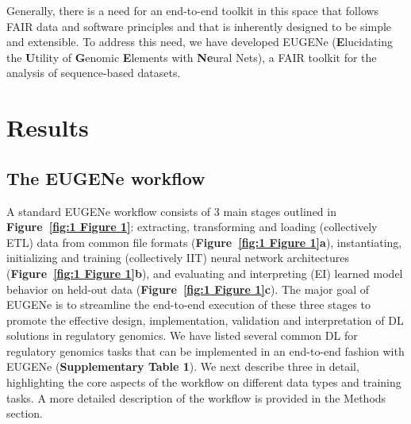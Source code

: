 Generally, there is a need for an end-to-end toolkit in this space that follows FAIR data and software principles\cite{Barker2022-on} and that is inherently designed to be simple and extensible. To address this need, we have developed EUGENe (\textbf{E}lucidating the \textbf{U}tility of \textbf{G}enomic \textbf{E}lements with \textbf{Ne}ural Nets), a FAIR toolkit for the analysis of sequence-based datasets.

\section{Results}

\subsection{The EUGENe workflow}

A standard EUGENe workflow consists of 3 main stages outlined in \textbf{Figure~\ref{fig:1 Figure 1}}: extracting, transforming and loading (collectively ETL) data from common file formats (\textbf{Figure~\ref{fig:1 Figure 1}a}), instantiating, initializing and training (collectively IIT) neural network architectures (\textbf{Figure~\ref{fig:1 Figure 1}b}), and evaluating and interpreting (EI) learned model behavior on held-out data (\textbf{Figure~\ref{fig:1 Figure 1}c}). The major goal of EUGENe is to streamline the end-to-end execution of these three stages to promote the effective design, implementation, validation and interpretation of DL solutions in regulatory genomics. We have listed several common DL for regulatory genomics tasks that can be implemented in an end-to-end fashion with EUGENe (\textbf{Supplementary Table 1}). We next describe three in detail, highlighting the core aspects of the workflow on different data types and training tasks. A more detailed description of the workflow is provided in the Methods section.

\clearpage

